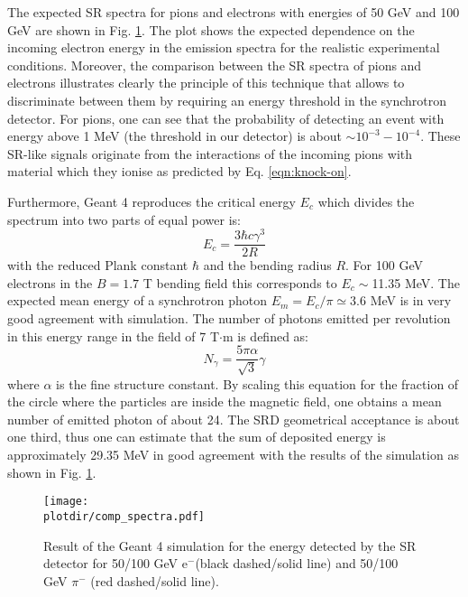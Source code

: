 The expected SR spectra for pions and electrons with energies of 50 GeV and 100 GeV are shown in Fig. \ref{fig:SRspectrum}. The plot shows the expected dependence on the incoming electron energy in the emission spectra for the realistic experimental conditions.
Moreover, the comparison between the SR spectra of pions and electrons illustrates clearly the principle of this technique that allows to discriminate between them by requiring an energy threshold in the synchrotron detector. 
For pions, one can see that the probability of detecting an event with energy above 1 MeV (the threshold in our detector) is about $\sim 10^{-3}-10^{-4}$.
These SR-like signals originate from the interactions of the incoming pions with material which they ionise as predicted by Eq. \ref{eqn:knock-on}.
 \par 
Furthermore, Geant 4 reproduces the critical energy $E_c$ which divides the spectrum into two parts of equal power is:
\begin{equation}
E_c = \frac{3 \hbar c \gamma^3}{2R}
\end{equation}
with the reduced Plank constant $\hbar$ and the bending radius $R$. 
 For 100 GeV electrons in the  $B=1.7$ T bending field this corresponds to $E_c\sim$11.35 MeV. The expected mean energy of a synchrotron photon $E_m=E_c/\pi\simeq 3.6$ MeV is in very good agreement with simulation. The number of photons emitted per revolution in this energy range in the field of 7 T$\cdot$m is defined as:
\begin{equation}
N_\gamma = \frac{5 \pi \alpha}{\sqrt{3}}\gamma
\end{equation}
where $\alpha$ is the fine structure constant. 
By scaling this equation for the fraction of the circle where the particles are inside the magnetic field, one obtains a mean number of emitted photon of about 24.
The SRD geometrical acceptance is about one third,  thus one can estimate that the sum of deposited energy is approximately 29.35 MeV in good agreement with the results of the simulation as shown in Fig. \ref{fig:SRspectrum}. 
 
\begin{figure}[htb!]
\centering
\texttt{[image: \\plotdir/comp\_spectra.pdf]}
\caption{Result of the Geant 4 simulation for the energy detected by the SR detector for 50/100 GeV e$^-$(black dashed/solid line) and 50/100 GeV $\pi^-$ (red dashed/solid line).}
\label{fig:SRspectrum}
\end{figure}

